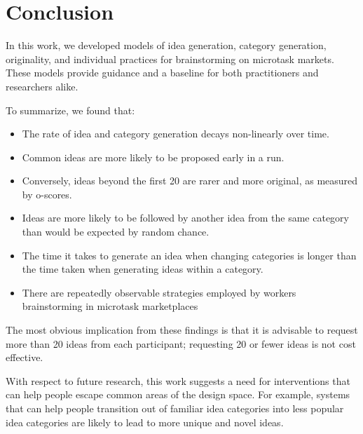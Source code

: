 

\section{Conclusion}

In this work, we developed models of idea generation, category generation, originality, and individual practices for brainstorming on microtask markets. These models provide guidance and a baseline for both practitioners and researchers alike.

To summarize, we found that:

\begin{itemize}
\item The rate of idea and category generation decays non-linearly over time. 
\item Common ideas are more likely to be proposed early in a run. 
\item Conversely, ideas beyond the first 20 are rarer and more original, as measured by o-scores. %
\item Ideas are more likely to be followed by another idea from the same category than would be expected by random chance.
\item The time it takes to generate an idea when changing categories is longer than the time taken when generating ideas within a category.
\item There are repeatedly observable strategies employed by workers brainstorming in microtask marketplaces
\end{itemize}

The most obvious implication from these findings is that it is advisable to request more than 20 ideas from each participant; requesting 20 or fewer ideas is not cost effective.

With respect to future research, this work suggests a need for interventions that can help people escape common areas of the design space. For example, systems that can help people transition out of familiar idea categories into less popular idea categories are likely to lead to more unique and novel ideas.
